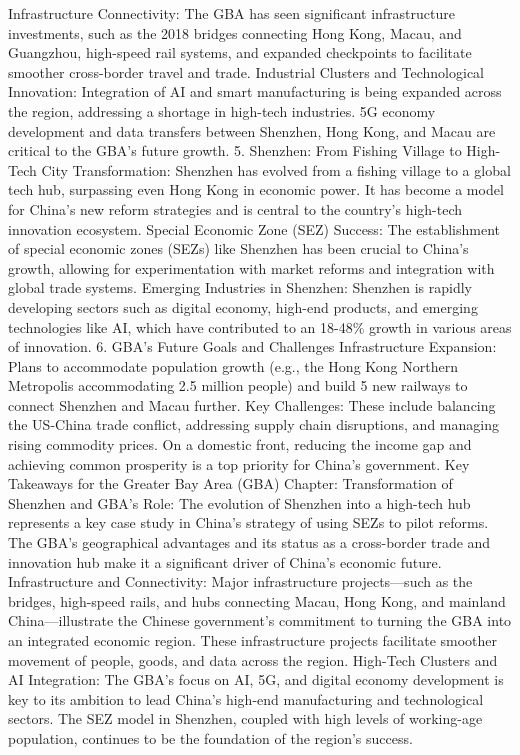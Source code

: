 Infrastructure Connectivity: The GBA has seen significant infrastructure investments, such as the 2018 bridges connecting Hong Kong, Macau, and Guangzhou, high-speed rail systems, and expanded checkpoints to facilitate smoother cross-border travel and trade.
Industrial Clusters and Technological Innovation:
Integration of AI and smart manufacturing is being expanded across the region, addressing a shortage in high-tech industries.
5G economy development and data transfers between Shenzhen, Hong Kong, and Macau are critical to the GBA’s future growth.
5. Shenzhen: From Fishing Village to High-Tech City
Transformation: Shenzhen has evolved from a fishing village to a global tech hub, surpassing even Hong Kong in economic power. It has become a model for China’s new reform strategies and is central to the country’s high-tech innovation ecosystem.
Special Economic Zone (SEZ) Success: The establishment of special economic zones (SEZs) like Shenzhen has been crucial to China’s growth, allowing for experimentation with market reforms and integration with global trade systems.
Emerging Industries in Shenzhen:
Shenzhen is rapidly developing sectors such as digital economy, high-end products, and emerging technologies like AI, which have contributed to an 18-48\% growth in various areas of innovation.
6. GBA’s Future Goals and Challenges
Infrastructure Expansion: Plans to accommodate population growth (e.g., the Hong Kong Northern Metropolis accommodating 2.5 million people) and build 5 new railways to connect Shenzhen and Macau further.
Key Challenges: These include balancing the US-China trade conflict, addressing supply chain disruptions, and managing rising commodity prices. On a domestic front, reducing the income gap and achieving common prosperity is a top priority for China’s government.
Key Takeaways for the Greater Bay Area (GBA) Chapter:
Transformation of Shenzhen and GBA's Role: The evolution of Shenzhen into a high-tech hub represents a key case study in China’s strategy of using SEZs to pilot reforms. The GBA’s geographical advantages and its status as a cross-border trade and innovation hub make it a significant driver of China's economic future.
Infrastructure and Connectivity: Major infrastructure projects—such as the bridges, high-speed rails, and hubs connecting Macau, Hong Kong, and mainland China—illustrate the Chinese government's commitment to turning the GBA into an integrated economic region. These infrastructure projects facilitate smoother movement of people, goods, and data across the region.
High-Tech Clusters and AI Integration: The GBA’s focus on AI, 5G, and digital economy development is key to its ambition to lead China’s high-end manufacturing and technological sectors. The SEZ model in Shenzhen, coupled with high levels of working-age population, continues to be the foundation of the region's success.
